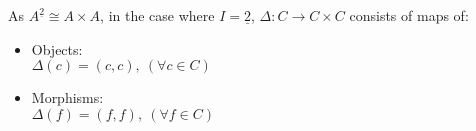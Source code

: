 \begin{remark}
  As $A^{\underline{2}} \cong A\times A$, in the case where $I = \underline{2}$,
  $\Delta: C\to C\times C$ consists of maps of:
  \parencite{awodey:category_theory}
  \begin{itemize}
    \item Objects:\\
      $\Delta(c) = (c, c),\ (\forall c\in C)$
    \item Morphisms:\\
      $\Delta(f) = (f, f),\ (\forall f\in C)$
  \end{itemize}
\end{remark}
